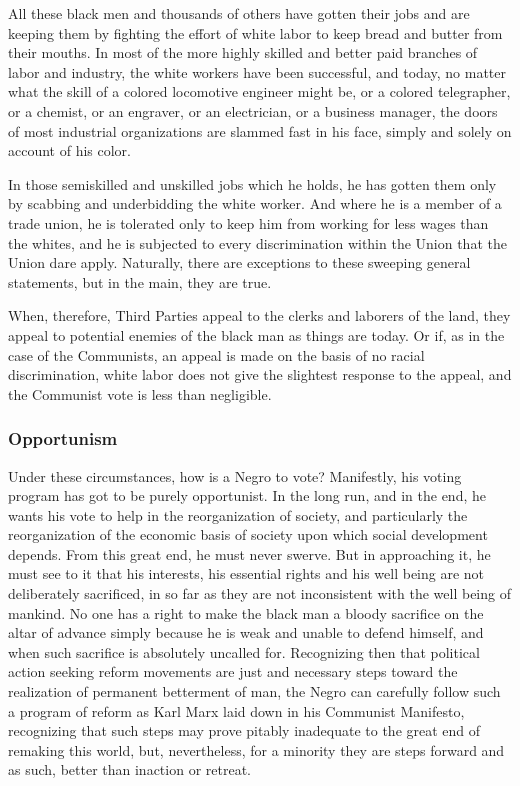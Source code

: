 \documentclass[letterpaper,10pt,english]{jupyterBook}
\begin{document}
\sphinxAtStartPar
All these black men and thousands of others have gotten their jobs and are keeping them by fighting the effort of white labor to keep bread and butter from their mouths. In most of the more highly skilled and better paid branches of labor and industry, the white workers have been successful, and today, no matter what the skill of a colored locomotive engineer might be, or a colored telegrapher, or a chemist, or an engraver, or an electrician, or a business manager, the doors of most industrial organizations are slammed fast in his face, simply and solely on account of his color.

\sphinxAtStartPar
In those semi\sphinxhyphen{}skilled and unskilled jobs which he holds, he has gotten them only by scabbing and underbidding the white worker. And where he is a member of a trade union, he is tolerated only to keep him from working for less wages than the whites, and he is subjected to every discrimination within the Union that the Union dare apply. Naturally, there are exceptions to these sweeping general statements, but in the main, they are true.

\sphinxAtStartPar
When, therefore, Third Parties appeal to the clerks and laborers of the land, they appeal to potential enemies of the black man as things are today. Or if, as in the case of the Communists, an appeal is made on the basis of no racial discrimination, white labor does not give the slightest response to the appeal, and the Communist vote is less than negligible.


\subsubsection{Opportunism}
\label{\detokenize{Volumes/40/06/strategy_of_the_negro_voter:opportunism}}
\sphinxAtStartPar
Under these circumstances, how is a Negro to vote? Manifestly, his voting program has got to be purely opportunist. In the long run, and in the end, he wants his vote to help in the re\sphinxhyphen{}organization of society, and particularly the re\sphinxhyphen{}organization of the economic basis of society upon which social development depends. From this great end, he must never swerve. But in approaching it, he must see to it that his interests, his essential rights and his well being are not deliberately sacrificed, in so far as they are not inconsistent with the well being of mankind. No one has a right to make the black man a bloody sacrifice on the altar of advance simply because he is weak and unable to defend himself, and when such sacrifice is absolutely uncalled for. Recognizing then that political action seeking reform movements are just and necessary steps toward the realization of permanent betterment of man, the Negro can carefully follow such a program of reform as Karl Marx laid down in his Communist Manifesto, recognizing that such steps may prove pitably inadequate to the great end of re\sphinxhyphen{}making this world, but, nevertheless, for a minority they are steps forward and as such, better than inaction or retreat.
\end{document}

